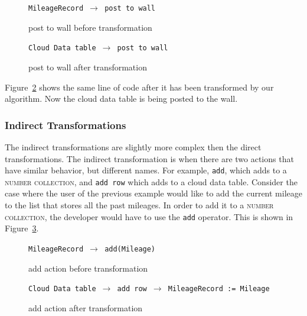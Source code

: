 \documentclass{sigplanconf}
\begin{document}
\begin{figure}[htbp!]
\begin{center}
\texttt{MileageRecord $\rightarrow$ post to wall}

\end{center}
\nocaptionrule
\caption{post to wall before transformation}
\label{fig:numCol_postToWall}
\end{figure}

\begin{figure}[htbp!]
\begin{center}
\texttt{Cloud Data table $\rightarrow$ post to wall}
\nocaptionrule
\caption{post to wall after transformation}
\label{fig:CloudTable_postToWall}
\end{center}
\end{figure}

Figure~\ref{fig:CloudTable_postToWall}  shows the same line of code after it has been transformed by our algorithm.  Now the cloud data table is being posted to the wall.




\subsubsection{Indirect Transformations}
The indirect transformations are slightly more complex then the direct transformations.  The indirect transformation is when there are two actions that have similar behavior, but different names.  For example, \texttt{add}, which adds to a \textsc{number collection}, and \texttt{add row} which adds to a cloud data table.  Consider the case where the user of the previous example would like to add the current mileage to the list that stores all the past mileages.  In order to add it to a \textsc{number collection}, the developer would have to use the \texttt{add} operator.  This is shown in Figure~\ref{fig:numCol_Add}.

\begin{figure}[htbp!]
\begin{center}
\texttt{MileageRecord $\rightarrow$ add(Mileage)}
\nocaptionrule
\caption{add action before transformation}
\label{fig:numCol_Add}
\end{center}
\end{figure}
\begin{figure}[htbp!]
\begin{center}
\texttt{Cloud Data table $\rightarrow$ add row $\rightarrow$ MileageRecord := Mileage}
\nocaptionrule
\caption{add action after transformation}
\label{fig:CloudTable_Add}
\end{center}
\end{figure}
\end{document}
